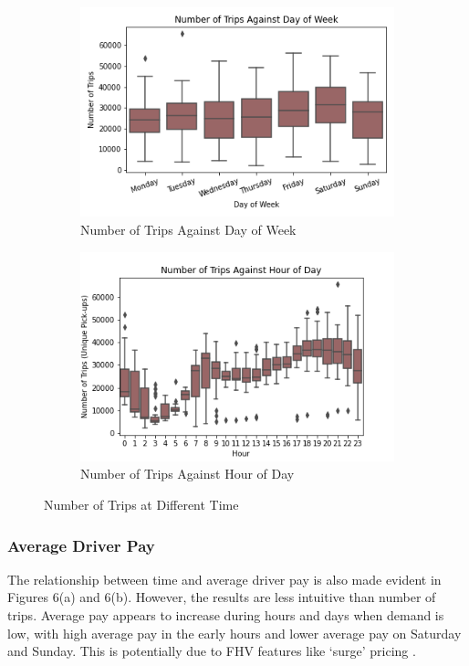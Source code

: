 \documentclass[11pt]{article}
\begin{document}
\begin{figure}[h]
\centering
\begin{subfigure}{.5\textwidth}
  \centering
  \includegraphics[width=0.9\linewidth]{plots/trips_v_day.png}
  \caption{Number of Trips Against Day of Week}
  \label{fig:sub1}
\end{subfigure}%
\begin{subfigure}{.5\textwidth}
  \centering
  \includegraphics[width=0.9\linewidth]{plots/trips_v_hour.png}
  \caption{Number of Trips Against Hour of Day}
  \label{fig:sub2}
\end{subfigure}
\caption{Number of Trips at Different Time}
\label{fig:test}
\end{figure}

\subsubsection{Average Driver Pay}

The relationship between time and average driver pay is also made evident in Figures 6(a) and 6(b). However, the results are less intuitive than number of trips. Average pay appears to increase during hours and days when demand is low, with high average pay in the early hours and lower average pay on Saturday and Sunday. This is potentially due to FHV features like `surge' pricing \cite{surge}.
\end{document}
